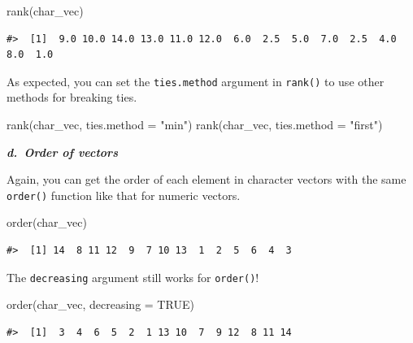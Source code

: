 \documentclass[
]{book}
\newenvironment{Shaded}{\begin{snugshade}}{\end{snugshade}}
\newcommand{\AttributeTok}[1]{\textcolor[rgb]{0.77,0.63,0.00}{#1}}
\newcommand{\ConstantTok}[1]{\textcolor[rgb]{0.00,0.00,0.00}{#1}}
\newcommand{\FunctionTok}[1]{\textcolor[rgb]{0.00,0.00,0.00}{#1}}
\newcommand{\NormalTok}[1]{#1}
\newcommand{\StringTok}[1]{\textcolor[rgb]{0.31,0.60,0.02}{#1}}
\begin{document}
\begin{Shaded}
\begin{Highlighting}[]
\FunctionTok{rank}\NormalTok{(char\_vec)}
\end{Highlighting}
\end{Shaded}

\begin{verbatim}
#>  [1]  9.0 10.0 14.0 13.0 11.0 12.0  6.0  2.5  5.0  7.0  2.5  4.0  8.0  1.0
\end{verbatim}

As expected, you can set the \texttt{ties.method} argument in \texttt{rank()} to use other methods for breaking ties.

\begin{Shaded}
\begin{Highlighting}[]
\FunctionTok{rank}\NormalTok{(char\_vec, }\AttributeTok{ties.method =} \StringTok{"min"}\NormalTok{)}
\FunctionTok{rank}\NormalTok{(char\_vec, }\AttributeTok{ties.method =} \StringTok{"first"}\NormalTok{)}
\end{Highlighting}
\end{Shaded}

\textbf{\emph{d.~Order of vectors}}

Again, you can get the order of each element in character vectors with the same \texttt{order()} function like that for numeric vectors.

\begin{Shaded}
\begin{Highlighting}[]
\FunctionTok{order}\NormalTok{(char\_vec)}
\end{Highlighting}
\end{Shaded}

\begin{verbatim}
#>  [1] 14  8 11 12  9  7 10 13  1  2  5  6  4  3
\end{verbatim}

The \texttt{decreasing} argument still works for \texttt{order()}!

\begin{Shaded}
\begin{Highlighting}[]
\FunctionTok{order}\NormalTok{(char\_vec, }\AttributeTok{decreasing =} \ConstantTok{TRUE}\NormalTok{)}
\end{Highlighting}
\end{Shaded}

\begin{verbatim}
#>  [1]  3  4  6  5  2  1 13 10  7  9 12  8 11 14
\end{verbatim}
\end{document}
